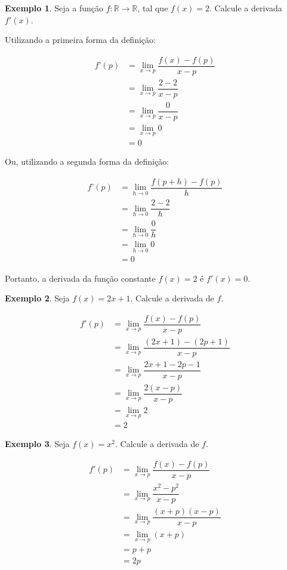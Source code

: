 \documentclass[12pt,openright,twoside,a4paper]{article}
\theoremstyle{definition}
\newtheorem{example}{Exemplo}[section]
\begin{document}
	\begin{example}Seja a função $f: \mathbb{R} \longrightarrow \mathbb{R}$, tal que $f(x) = 2$. Calcule a derivada $f'(x)$.

		Utilizando a primeira forma da definição:  
		
		
		\begin{align*}
			f’(p) &= \lim_{x \to p} \dfrac{f(x) - f(p)}{x - p} \\
			&= \lim_{x \to p} \dfrac{2 - 2}{x - p} \\
			&= \lim_{x \to p} \dfrac{0}{x - p} \\
			&= \lim_{x \to p} 0 \\
			&= 0
		\end{align*}  
		
		
		Ou, utilizando a segunda forma da definição:  
		
		
		\begin{align*}
			f’(p) &= \lim_{h \to 0} \dfrac{f(p + h) - f(p)}{h} \\
			&= \lim_{h \to 0} \dfrac{2 - 2}{h} \\
			&= \lim_{h \to 0} \dfrac{0}{h} \\
			&= \lim_{h \to 0} 0 \\
			&= 0
		\end{align*}  
		
		
		Portanto, a derivada da função constante $f(x) = 2$ é $f'(x) = 0$.
	\end{example}
	
	\begin{example}
		Seja $f(x) = 2x + 1$. Calcule a derivada de $f$.
		
		\begin{align*}
			f'(p) &= \lim_{x \to p} \dfrac{f(x) - f(p)}{x-p} \\
			&= \lim_{x \to p} \dfrac{(2x + 1) - (2p + 1)}{x-p} \\
			&= \lim_{x \to p} \dfrac{2x + 1 - 2p - 1}{x-p} \\
			&= \lim_{x \to p} \dfrac{2(x - p)}{x-p} \\
			&= \lim_{x \to p} 2 \\
			&= 2
		\end{align*}
		
		
	\end{example}
	
	\begin{example}
		Seja $f(x) = x^2$. Calcule a derivada de $f$.
		
		\begin{align*}
			f'(p) &= \lim_{x \to p} \dfrac{f(x) - f(p)}{x-p} \\
			&= \lim_{x \to p} \dfrac{x^2 - p^2}{x-p} \\
			&= \lim_{x \to p} \dfrac{(x + p)(x - p)}{x-p} \\
			&= \lim_{x \to p} (x + p) \\
			&= p + p \\
			&= 2p
		\end{align*}
		
		
	\end{example}
	
\end{document}
